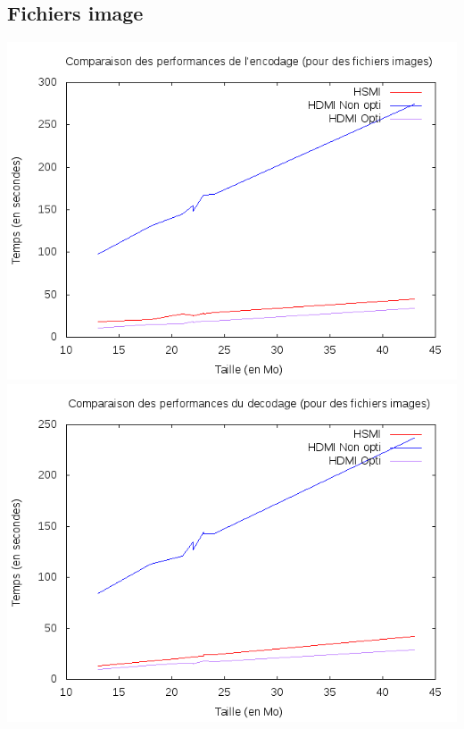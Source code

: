 \documentclass{article}
\begin{document}
\subsection{Fichiers image}
\begin{center}
\includegraphics[scale=0.5]{Perf/img/encodecompimg2.png}
\includegraphics[scale=0.5]{Perf/img/decodecompimg2.png}
\end{center}
\end{document}
